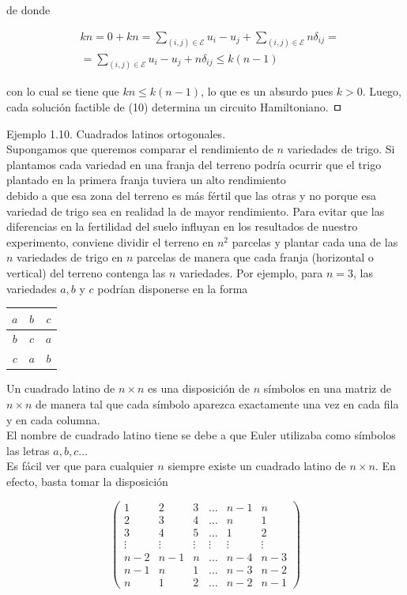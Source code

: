 \documentclass[10pt]{article}
\begin{document}
de donde

$$
\begin{aligned}
& k n=0+k n=\sum_{(i, j) \in \mathcal{E}} u_{i}-u_{j}+\sum_{(i, j) \in \mathcal{E}} n \delta_{i j}= \\
& =\sum_{(i, j) \in \mathcal{E}} u_{i}-u_{j}+n \delta_{i j} \leq k(n-1)
\end{aligned}
$$

con lo cual se tiene que $k n \leq k(n-1)$, lo que es un absurdo pues $k>0$. Luego, cada solución factible de (10) determina un circuito Hamiltoniano. ㅁ

Ejemplo 1.10. Cuadrados latinos ortogonales.\\
Supongamos que queremos comparar el rendimiento de $n$ variedades de trigo. Si plantamos cada variedad en una franja del terreno podría ocurrir que el trigo plantado en la primera franja tuviera un alto rendimiento\\
debido a que esa zona del terreno es más fértil que las otras y no porque esa variedad de trigo sea en realidad la de mayor rendimiento. Para evitar que las diferencias en la fertilidad del suelo influyan en los resultados de nuestro experimento, conviene dividir el terreno en $n^{2}$ parcelas y plantar cada una de las $n$ variedades de trigo en $n$ parcelas de manera que cada franja (horizontal o vertical) del terreno contenga las $n$ variedades. Por ejemplo, para $n=3$, las variedades $a, b$ y $c$ podrían disponerse en la forma

\begin{center}
\begin{tabular}{|c|c|c|}
\hline
$a$ & $b$ & $c$ \\
\hline
$b$ & $c$ & $a$ \\
\hline
$c$ & $a$ & $b$ \\
\hline
\end{tabular}
\end{center}

Un cuadrado latino de $n \times n$ es una disposición de $n$ símbolos en una matriz de $n \times n$ de manera tal que cada símbolo aparezca exactamente una vez en cada fila y en cada columna.\\
El nombre de cuadrado latino tiene se debe a que Euler utilizaba como símbolos las letras $a, b, c \ldots$\\
Es fácil ver que para cualquier $n$ siempre existe un cuadrado latino de $n \times n$. En efecto, basta tomar la disposición

$$
\left(\begin{array}{cccccc}
1 & 2 & 3 & \ldots & n-1 & n \\
2 & 3 & 4 & \ldots & n & 1 \\
3 & 4 & 5 & \ldots & 1 & 2 \\
\vdots & \vdots & \vdots & \vdots & \vdots & \vdots \\
n-2 & n-1 & n & \ldots & n-4 & n-3 \\
n-1 & n & 1 & \ldots & n-3 & n-2 \\
n & 1 & 2 & \ldots & n-2 & n-1
\end{array}\right)
$$
\end{document}
